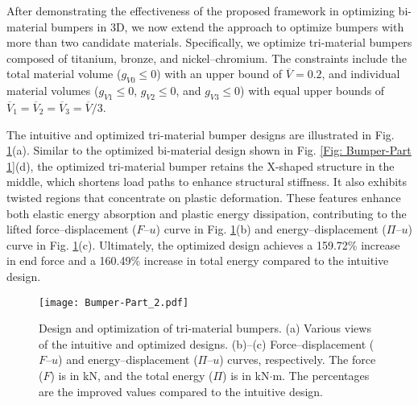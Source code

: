 \documentclass[preprint,11pt]{elsarticle}
\theoremstyle{definition}
\begin{document}
After demonstrating the effectiveness of the proposed framework in optimizing bi-material bumpers in 3D, we now extend the approach to optimize bumpers with more than two candidate materials. Specifically, we optimize tri-material bumpers composed of titanium, bronze, and nickel--chromium. The constraints include the total material volume ($g_{V0} \leq 0$) with an upper bound of $\overline{V} = 0.2$, and individual material volumes ($g_{V1} \leq 0$, $g_{V2} \leq 0$, and $g_{V3} \leq 0$) with equal upper bounds of $\overline{V}_1 = \overline{V}_2 = \overline{V}_3 = \overline{V}/3$.

The intuitive and optimized tri-material bumper designs are illustrated in Fig. \ref{Fig: Bumper-Part 2}(a). Similar to the optimized bi-material design shown in Fig. \ref{Fig: Bumper-Part 1}(d), the optimized tri-material bumper retains the X-shaped structure in the middle, which shortens load paths to enhance structural stiffness. It also exhibits twisted regions that concentrate on plastic deformation. These features enhance both elastic energy absorption and plastic energy dissipation, contributing to the lifted force--displacement ($F$--$u$) curve in Fig. \ref{Fig: Bumper-Part 2}(b) and energy--displacement ($\Pi$--$u$) curve in Fig. \ref{Fig: Bumper-Part 2}(c). Ultimately, the optimized design achieves a 159.72\% increase in end force and a 160.49\% increase in total energy compared to the intuitive design.

\begin{figure}[!htbp]
    \centering
    \texttt{[image: Bumper-Part\_2.pdf]}
    \caption{Design and optimization of tri-material bumpers. (a) Various views of the intuitive and optimized designs. (b)--(c) Force--displacement ($F$--$u$) and energy--displacement ($\Pi$--$u$) curves, respectively. The force ($F$) is in kN, and the total energy ($\Pi$) is in kN$\cdot$m. The percentages are the improved values compared to the intuitive design.}
    \label{Fig: Bumper-Part 2}
\end{figure}
\end{document}
